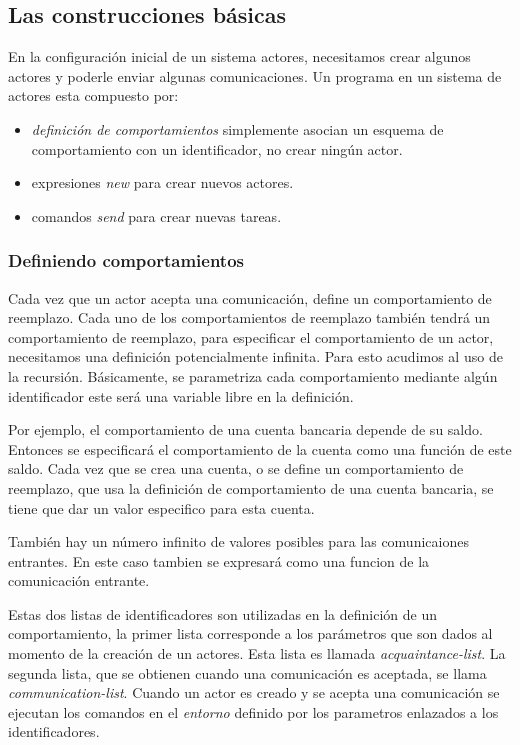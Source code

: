 \subsection{Las construcciones básicas}

En la configuración inicial de un sistema actores, necesitamos crear algunos actores y poderle enviar algunas comunicaciones. Un programa en un sistema de actores esta compuesto por:

\begin{itemize}
 \item \textit{definición de comportamientos} simplemente asocian un esquema de comportamiento con un identificador, no crear ningún actor.
 \item expresiones \textit{new} para crear nuevos actores.
 \item comandos \textit{send} para crear nuevas tareas.
\end{itemize}


\subsubsection*{Definiendo comportamientos}
Cada vez que un actor acepta una comunicación, define un comportamiento de reemplazo. Cada uno de los comportamientos de reemplazo también tendrá un comportamiento de reemplazo, para especificar el comportamiento de un actor, necesitamos una definición potencialmente infinita. Para esto acudimos al uso de la recursión. Básicamente, se parametriza cada comportamiento mediante algún identificador este será una variable libre en la definición. 

Por ejemplo, el comportamiento de una cuenta bancaria depende de su saldo. Entonces se especificará el comportamiento de la cuenta como una función de este saldo. Cada vez que se crea una cuenta, o se define un comportamiento de reemplazo, que usa la definición de comportamiento de una cuenta bancaria, se tiene que dar un valor especifico para esta cuenta.

También hay un número infinito de valores posibles para las comunicaiones entrantes. En este caso tambien se expresará como una funcion de la comunicación entrante.

Estas dos listas de identificadores son utilizadas en la definición de un comportamiento, la primer lista corresponde a los parámetros que son dados al momento de la creación de un actores. Esta lista es llamada \textit{acquaintance-list}. La segunda lista, que se obtienen cuando una comunicación es aceptada, se llama \textit{communication-list}. Cuando un actor es creado y se acepta una comunicación se ejecutan los comandos en el \textit{entorno} definido por los parametros enlazados a los identificadores.

